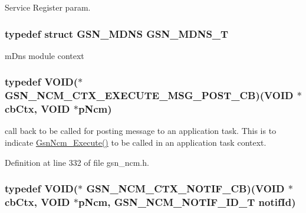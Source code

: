 Service Register param. 

\hypertarget{a00668_gaaa3d044b4a5b3e8b4817fca5ad460e05}{
\subsubsection[{GSN\_\-MDNS\_\-T}]{\setlength{\rightskip}{0pt plus 5cm}typedef struct {\bf GSN\_\-MDNS} {\bf GSN\_\-MDNS\_\-T}}}
\label{a00668_gaaa3d044b4a5b3e8b4817fca5ad460e05}


mDns module context 

\hypertarget{a00668_gaf3a0737ada4d7a112e4fff6779bc8162}{
\subsubsection[{GSN\_\-NCM\_\-CTX\_\-EXECUTE\_\-MSG\_\-POST\_\-CB}]{\setlength{\rightskip}{0pt plus 5cm}typedef VOID($\ast$ {\bf GSN\_\-NCM\_\-CTX\_\-EXECUTE\_\-MSG\_\-POST\_\-CB})(VOID $\ast$cbCtx, VOID $\ast$pNcm)}}
\label{a00668_gaf3a0737ada4d7a112e4fff6779bc8162}


call back to be called for posting message to an application task. This is to indicate \hyperlink{a00688_ga3ed4d28d4f2a8195d6c37f5032ee0bbd}{GsnNcm\_\-Execute()} to be called in an application task context. 



Definition at line 332 of file gsn\_\-ncm.h.

\hypertarget{a00668_ga9fb71d435556873549a9da8758741a14}{
\subsubsection[{GSN\_\-NCM\_\-CTX\_\-NOTIF\_\-CB}]{\setlength{\rightskip}{0pt plus 5cm}typedef VOID($\ast$ {\bf GSN\_\-NCM\_\-CTX\_\-NOTIF\_\-CB})(VOID $\ast$cbCtx, VOID $\ast$pNcm, {\bf GSN\_\-NCM\_\-NOTIF\_\-ID\_\-T} notifId)}}
\label{a00668_ga9fb71d435556873549a9da8758741a14}



